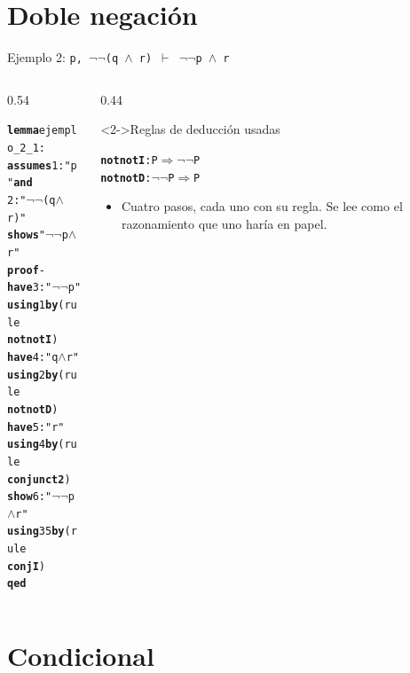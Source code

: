 \documentclass[11pt,aspectratio=169]{beamer}
\newcommand{\sAnd}{\(\wedge\)}
\newcommand{\sNot}{\(\neg\)}
\newcommand{\sMeta}{\(\Longrightarrow\)}
\newcommand{\sTurn}{\(\vdash\)}
\newcommand{\kw}[1]{\textcolor{isaCmd}{\textbf{#1}}}
\newcommand{\str}[1]{\textcolor{isaStr}{#1}}
\newcommand{\Rn}[1]{\textcolor{granate}{\textbf{#1}}}
\newcommand{\R}[1]{{\setlength{\fboxsep}{1pt}%
  \colorbox{resalte}{\ttfamily\bfseries\textcolor{granate}{#1}}}}
\begin{document}
\section{Doble negación}

\begin{frame}[fragile]{Ejemplo 2: \texttt{p, \sNot\sNot(q \sAnd{} r) \sTurn{} \sNot\sNot p \sAnd{} r}}
  \begin{columns}[T]
    \begin{column}{0.54\textwidth}
\begin{alltt}\footnotesize
\kw{lemma} ejemplo_2_1:
  \kw{assumes} 1: \str{"p"} \kw{and}
          2: \str{"\sNot\sNot(q \sAnd{} r)"}
  \kw{shows} \str{"\sNot\sNot p \sAnd{} r"}
\kw{proof} -
  \kw{have} 3: \str{"\sNot\sNot p"}
    \kw{using} 1 \kw{by} (rule \R{notnotI})
  \kw{have} 4: \str{"q \sAnd{} r"}
    \kw{using} 2 \kw{by} (rule \R{notnotD})
  \kw{have} 5: \str{"r"}
    \kw{using} 4 \kw{by} (rule \R{conjunct2})
  \kw{show} 6: \str{"\sNot\sNot p \sAnd{} r"}
    \kw{using} 3 5 \kw{by} (rule \R{conjI})
\kw{qed}
\end{alltt}
    \end{column}
    \begin{column}{0.44\textwidth}
      \begin{block}<2->{Reglas de deducción usadas}
\begin{alltt}\scriptsize
\Rn{notnotI}: P \sMeta{} \sNot\sNot P
\Rn{notnotD}: \sNot\sNot P \sMeta{} P
\end{alltt}
\end{block}
      \footnotesize
      \begin{itemize}
        \item<3-> Cuatro pasos, cada uno con su regla. Se lee como el
          razonamiento que uno haría en papel.
      \end{itemize}
    \end{column}
  \end{columns}
\end{frame}

\section{Condicional}
\end{document}
